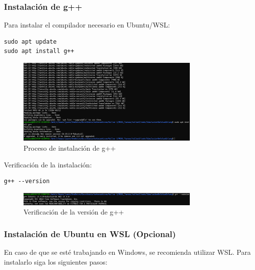 \documentclass{article}
\begin{document}
\subsubsection{Instalación de g++}
Para instalar el compilador necesario en Ubuntu/WSL:
\begin{verbatim}
sudo apt update
sudo apt install g++
\end{verbatim}

\begin{figure}[H]
    \centering
    \includegraphics[width=0.8\textwidth]{images/manualUsuarioErlangBC_1.png}
    \caption{Proceso de instalación de g++}
    \label{fig:instalacion_mm1}
\end{figure}

Verificación de la instalación:
\begin{verbatim}
g++ --version
\end{verbatim}

\begin{figure}[H]
    \centering
    \includegraphics[width=0.8\textwidth]{images/manualUsuarioErlangBC_2.png}
    \caption{Verificación de la versión de g++}
    \label{fig:version_mm1}
\end{figure}

\subsubsection{Instalación de Ubuntu en WSL (Opcional)}
En caso de que se esté trabajando en Windows, se recomienda utilizar WSL. Para instalarlo siga los siguientes pasos:
\end{document}
